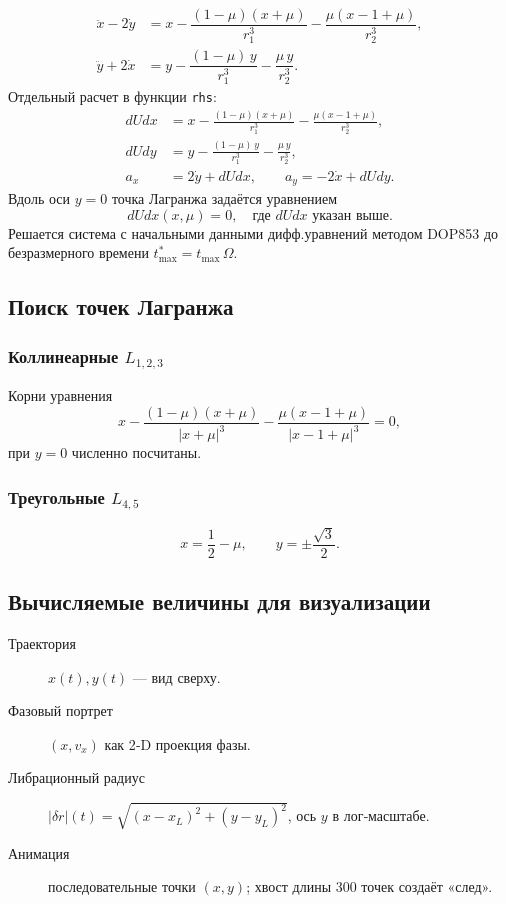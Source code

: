 \documentclass[12pt]{article}
\begin{document}
\[
\boxed{
\begin{aligned}
\ddot x-2\dot y &=
  x-\dfrac{(1-\mu)(x+\mu)}{r_1^{3}}
    -\dfrac{\mu(x-1+\mu)}{r_2^{3}},\\[6pt]
\ddot y+2\dot x &=
  y-\dfrac{(1-\mu)\,y}{r_1^{3}}
    -\dfrac{\mu\,y}{r_2^{3}}.
\end{aligned}}
\]
Отдельный расчет в функции \texttt{rhs}:
\begin{align*}
dUdx &= x-\frac{(1-\mu)(x+\mu)}{r_1^{3}}
           -\frac{\mu(x-1+\mu)}{r_2^{3}},\\
dUdy &= y-\frac{(1-\mu)\,y}{r_1^{3}}
           -\frac{\mu\,y}{r_2^{3}},\\
a_x &=  2\dot y + dUdx,\qquad
a_y = -2\dot x + dUdy.
\end{align*}
Вдоль оси $y=0$ точка Лагранжа задаётся уравнением  
\[
dUdx(x,\mu)=0,
\quad\text{где }dUdx \text{ указан выше}.
\]
Решается система с начальными данными дифф.уравнений
методом DOP853 до безразмерного времени
\(t_{\max}^{*}=t_{\max}\,\Omega\).

\subsection{Поиск точек Лагранжа}

\subsubsection{Коллинеарные $L_{1,2,3}$}
Корни уравнения
\[
x-\frac{(1-\mu)(x+\mu)}{|x+\mu|^{3}}
 -\frac{\mu(x-1+\mu)}{|x-1+\mu|^{3}}=0,
\]
при $y=0$ численно посчитаны.
\subsubsection{Треугольные $L_{4,5}$}
\[
x=\frac12-\mu,\qquad
y=\pm\frac{\sqrt3}{2}.
\]

\subsection{Вычисляемые величины для визуализации}

\begin{description}
  \item[Траектория] $x(t),y(t)$ — вид сверху.
  \item[Фазовый портрет] $(x,v_x)$ как 2‑D проекция фазы.
  \item[Либрационный радиус] $|\delta r|(t)
    =\sqrt{(x-x_L)^2+(y-y_L)^2}$, ось $y$ в лог‑масштабе.
  \item[Анимация] последовательные точки $(x,y)$;
        хвост длины 300 точек создаёт «след».
\end{description}
\end{document}
